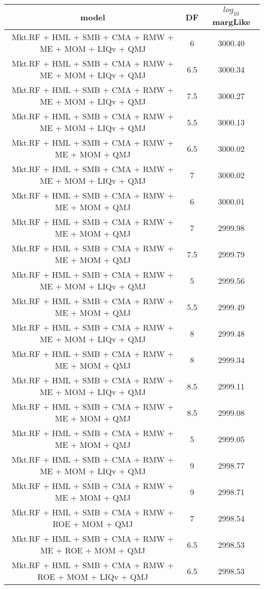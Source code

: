 \begin{tabular}{ccc}
  \hline
model & DF & $log_{10}$ margLike \\ 
  \hline
Mkt.RF + HML + SMB + CMA + RMW + ME + MOM + LIQv + QMJ & 6 & 3000.40 \\ 
  Mkt.RF + HML + SMB + CMA + RMW + ME + MOM + LIQv + QMJ & 6.5 & 3000.34 \\ 
  Mkt.RF + HML + SMB + CMA + RMW + ME + MOM + LIQv + QMJ & 7.5 & 3000.27 \\ 
  Mkt.RF + HML + SMB + CMA + RMW + ME + MOM + LIQv + QMJ & 5.5 & 3000.13 \\ 
  Mkt.RF + HML + SMB + CMA + RMW + ME + MOM + QMJ & 6.5 & 3000.02 \\ 
  Mkt.RF + HML + SMB + CMA + RMW + ME + MOM + LIQv + QMJ & 7 & 3000.02 \\ 
  Mkt.RF + HML + SMB + CMA + RMW + ME + MOM + QMJ & 6 & 3000.01 \\ 
  Mkt.RF + HML + SMB + CMA + RMW + ME + MOM + QMJ & 7 & 2999.98 \\ 
  Mkt.RF + HML + SMB + CMA + RMW + ME + MOM + QMJ & 7.5 & 2999.79 \\ 
  Mkt.RF + HML + SMB + CMA + RMW + ME + MOM + LIQv + QMJ & 5 & 2999.56 \\ 
  Mkt.RF + HML + SMB + CMA + RMW + ME + MOM + QMJ & 5.5 & 2999.49 \\ 
  Mkt.RF + HML + SMB + CMA + RMW + ME + MOM + LIQv + QMJ & 8 & 2999.48 \\ 
  Mkt.RF + HML + SMB + CMA + RMW + ME + MOM + QMJ & 8 & 2999.34 \\ 
  Mkt.RF + HML + SMB + CMA + RMW + ME + MOM + LIQv + QMJ & 8.5 & 2999.11 \\ 
  Mkt.RF + HML + SMB + CMA + RMW + ME + MOM + QMJ & 8.5 & 2999.08 \\ 
  Mkt.RF + HML + SMB + CMA + RMW + ME + MOM + QMJ & 5 & 2999.05 \\ 
  Mkt.RF + HML + SMB + CMA + RMW + ME + MOM + LIQv + QMJ & 9 & 2998.77 \\ 
  Mkt.RF + HML + SMB + CMA + RMW + ME + MOM + QMJ & 9 & 2998.71 \\ 
  Mkt.RF + HML + SMB + CMA + RMW + ROE + MOM + QMJ & 7 & 2998.54 \\ 
  Mkt.RF + HML + SMB + CMA + RMW + ME + ROE + MOM + QMJ & 6.5 & 2998.53 \\ 
  Mkt.RF + HML + SMB + CMA + RMW + ROE + MOM + LIQv + QMJ & 6.5 & 2998.53 \\ 

\end{tabular}
